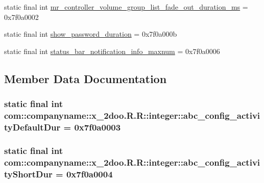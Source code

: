 \begin{CompactItemize}
\item 
static final int \hyperlink{classcom_1_1companyname_1_1x__2doo_1_1_r_1_1integer_5717c67a79e578ecdfc720a59d97a88a}{mr\_\-controller\_\-volume\_\-group\_\-list\_\-fade\_\-out\_\-duration\_\-ms} = 0x7f0a0002
\item 
static final int \hyperlink{classcom_1_1companyname_1_1x__2doo_1_1_r_1_1integer_41a2a0065b028acae42a82dd47b676a2}{show\_\-password\_\-duration} = 0x7f0a000b
\item 
static final int \hyperlink{classcom_1_1companyname_1_1x__2doo_1_1_r_1_1integer_82627f137faffabd171c6c8451882ff5}{status\_\-bar\_\-notification\_\-info\_\-maxnum} = 0x7f0a0006
\end{CompactItemize}


\subsection{Member Data Documentation}
\hypertarget{classcom_1_1companyname_1_1x__2doo_1_1_r_1_1integer_f2dde2c22e157f961db3e64e748e4207}{
\subsubsection[{abc\_\-config\_\-activityDefaultDur}]{\setlength{\rightskip}{0pt plus 5cm}static final int com::companyname::x\_\-2doo.R.R::integer::abc\_\-config\_\-activityDefaultDur = 0x7f0a0003}}
\label{classcom_1_1companyname_1_1x__2doo_1_1_r_1_1integer_f2dde2c22e157f961db3e64e748e4207}


\hypertarget{classcom_1_1companyname_1_1x__2doo_1_1_r_1_1integer_39a52000b6f5206239d07b9787e202f1}{
\subsubsection[{abc\_\-config\_\-activityShortDur}]{\setlength{\rightskip}{0pt plus 5cm}static final int com::companyname::x\_\-2doo.R.R::integer::abc\_\-config\_\-activityShortDur = 0x7f0a0004}}
\label{classcom_1_1companyname_1_1x__2doo_1_1_r_1_1integer_39a52000b6f5206239d07b9787e202f1}


